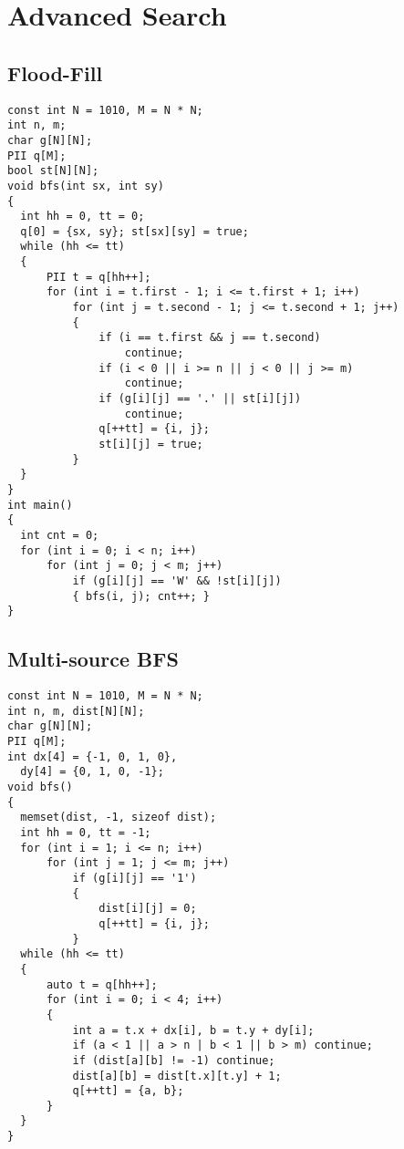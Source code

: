 \chapter{Advanced Search}\label{chap:AdvancedSearch}
\section{Flood-Fill}
\begin{lstlisting}
const int N = 1010, M = N * N;
int n, m;
char g[N][N];
PII q[M];
bool st[N][N];
void bfs(int sx, int sy)
{
  int hh = 0, tt = 0;
  q[0] = {sx, sy}; st[sx][sy] = true;
  while (hh <= tt)
  {
      PII t = q[hh++];
      for (int i = t.first - 1; i <= t.first + 1; i++)
          for (int j = t.second - 1; j <= t.second + 1; j++)
          {
              if (i == t.first && j == t.second)
                  continue;
              if (i < 0 || i >= n || j < 0 || j >= m)
                  continue;
              if (g[i][j] == '.' || st[i][j])
                  continue;
              q[++tt] = {i, j};
              st[i][j] = true;
          }
  }
}
int main()
{
  int cnt = 0;
  for (int i = 0; i < n; i++)
      for (int j = 0; j < m; j++)
          if (g[i][j] == 'W' && !st[i][j])
          { bfs(i, j); cnt++; }
}
\end{lstlisting}
\section{Multi-source BFS}
\begin{lstlisting}
const int N = 1010, M = N * N;
int n, m, dist[N][N];
char g[N][N];
PII q[M];
int dx[4] = {-1, 0, 1, 0}, 
  dy[4] = {0, 1, 0, -1};
void bfs()
{
  memset(dist, -1, sizeof dist);
  int hh = 0, tt = -1;
  for (int i = 1; i <= n; i++)
      for (int j = 1; j <= m; j++)
          if (g[i][j] == '1')
          {
              dist[i][j] = 0;
              q[++tt] = {i, j};
          }
  while (hh <= tt)
  {
      auto t = q[hh++];
      for (int i = 0; i < 4; i++)
      {
          int a = t.x + dx[i], b = t.y + dy[i];
          if (a < 1 || a > n | b < 1 || b > m) continue;
          if (dist[a][b] != -1) continue;
          dist[a][b] = dist[t.x][t.y] + 1;
          q[++tt] = {a, b};
      }
  }
}
\end{lstlisting}
